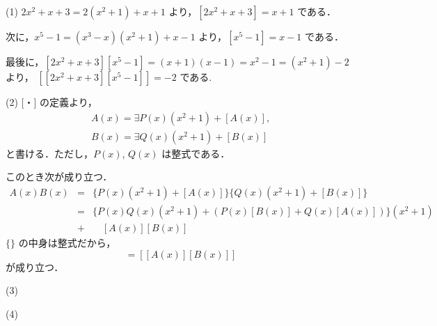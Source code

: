 \documentclass[main]{subfiles}
\begin{document}
\setcounter{prob}{3}
\begin{prob}

\end{prob}
\begin{pf}
(1) $2x^2+x+3 =2(x^2+1)+x+1$ より，$[2x^2+x+3] = x+1$ である．

次に，$x^5-1 = (x^3-x)(x^2+1)+x-1$ より，$[x^5-1] = x-1$ である．

最後に，$[2x^2+x+3][x^5-1] = (x+1)(x-1) = x^2-1 = (x^2+1)-2$ より，
$[[2x^2+x+3][x^5-1]] = -2$ である. 

(2) [・] の定義より， 
\begin{eqnarray*}
A(x) = \exists P(x)(x^2+1)+[A(x)], \\
B(x) = \exists Q(x)(x^2+1)+[B(x)]
\end{eqnarray*}
と書ける．ただし，$P(x)$, $Q(x)$ は整式である．

このとき次が成り立つ．
\begin{eqnarray*}
A(x)B(x) &=& \{P(x)(x^2+1)+[A(x)]\}\{Q(x)(x^2+1)+[B(x)]\} \\
				&=& \{P(x)Q(x)(x^2+1)+(P(x)[B(x)]+Q(x)[A(x)])\}(x^2+1) \\ 
				                                                        &+& \quad [A(x)][B(x)]
\end{eqnarray*}
$\{\}$ の中身は整式だから，
\begin{equation*}
[A(x)][B(x)] = [[A(x)][B(x)]]
\end{equation*}
が成り立つ．

(3)


(4)
\end{pf}
\begin{prob}

\end{prob}
\end{document}
